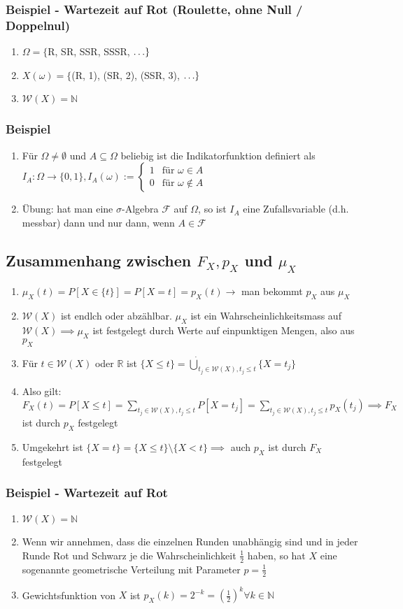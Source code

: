 \documentclass[10pt]{article}
\newcommand{\enumstart}{\begin{enumerate}}
\newcommand{\enumend}{\end{enumerate}}
\newcommand{\N}{\mathbb{N}}
\newcommand{\R}{\mathbb{R}}
\newcommand{\F}{\mathcal{F}}
\newcommand{\W}{\mathcal{W}}
\begin{document}
\subsubsection{Beispiel - Wartezeit auf Rot (Roulette, ohne Null / Doppelnul)}
\enumstart
	\item $\Omega = \{$R, SR, SSR, SSSR, $\mathellipsis\}$
	\item $X(\omega) = \{$(R, 1), (SR, 2), (SSR, 3), $\mathellipsis\}$
	\item $\W(X) = \N$
\enumend

\subsubsection{Beispiel}
\enumstart
	\item Für $\Omega \ne \emptyset$ und $A\subseteq \Omega$ beliebig ist die Indikatorfunktion definiert als $I_A: \Omega \rightarrow \{0,1\}, I_A(\omega) := \begin{cases}1 &\text{für } \omega \in A \\0 &\text{für } \omega \notin A\end{cases}$
	\item Übung: hat man eine $\sigma$-Algebra $\F$ auf $\Omega$, so ist $I_A$ eine Zufallsvariable (d.h. messbar) dann und nur dann, wenn $A \in \F$
\enumend

\subsection{Zusammenhang zwischen $F_X, p_X$ und $\mu_X$}
\enumstart
	\item $\mu_X(t) = P[X \in \{t\}] = P[X = t] = p_X(t) \rightarrow$ man bekommt $p_X$ aus $\mu_X$
	\item $\W(X)$ ist endlch oder abzählbar. $\mu_X$ ist ein Wahrscheinlichkeitsmass auf $\W(X) \implies \mu_X$ ist festgelegt durch Werte auf einpunktigen Mengen, also aus $p_X$
	\item Für $t \in \W(X)$ oder $\R$ ist $\{X \le t\} = \dot\bigcup_{t_j \in \W(X), t_j \le t}\{X = t_j\}$
	\item Also gilt: $F_X(t) = P[X \le t] = \sum_{t_j \in \W(X), t_j \le t}P[X = t_j] = \sum_{t_j \in \W(X), t_j \le t}p_X(t_j) \implies F_X$ ist durch $p_X$ festgelegt
	\item Umgekehrt ist $\{X = t\} = \{X \le t\} \setminus \{X < t\} \implies$ auch $p_X$ ist durch $F_X$ festgelegt
\enumend

\subsubsection{Beispiel - Wartezeit auf Rot}
\enumstart
	\item $\W(X) = \N$
	\item Wenn wir annehmen, dass die einzelnen Runden unabhängig sind und in jeder Runde Rot und Schwarz je die Wahrscheinlichkeit $\frac{1}{2}$ haben, so hat $X$ eine sogenannte geometrische Verteilung mit Parameter $p = \frac{1}{2}$
	\item Gewichtsfunktion von $X$ ist $p_X(k) = 2^{-k} = (\frac{1}{2})^k \forall k \in \N$
\enumend
\end{document}
